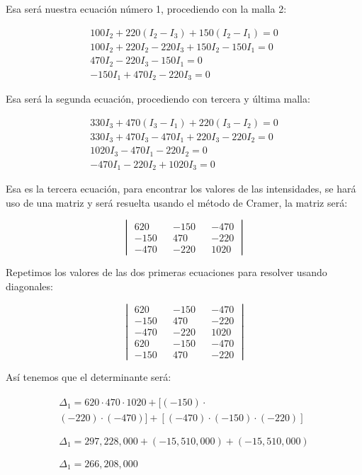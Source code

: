 \documentclass[conference]{IEEEtran}
\begin{document}
Esa será nuestra ecuación número 1, procediendo con la malla 2:

\begin{align*}
  100I_2 + 220(I_2 - I_3) + 150(I_2 - I_1) = 0 \\
  100I_2 + 220I_2 - 220I_3 + 150I_2 - 150I_1 = 0 \\
  470I_2 - 220I_3 - 150I_1 = 0 \\
  -150I_1 + 470I_2 - 220I_3 = 0
\end{align*}

Esa será la segunda ecuación, procediendo con tercera y última malla:

\begin{align*}
  330I_3 + 470(I_3 - I_1) + 220(I_3 - I_2) = 0 \\
  330I_3 + 470I_3 - 470I_1 + 220I_3 - 220I_2 = 0 \\
  1020I_3 - 470I_1 - 220I_2 = 0 \\
  -470I_1 - 220I_2 + 1020I_3 = 0
\end{align*}

Esa es la tercera ecuación, para encontrar los valores de las
intensidades, se hará uso de una matriz y será resuelta usando el
método de Cramer, la matriz será:

\begin{equation}
  \begin{vmatrix}
    620 && -150 && -470 \\
    -150 && 470 && -220 \\
    -470 && -220 && 1020
  \end{vmatrix}
\end{equation}

Repetimos los valores de las dos primeras ecuaciones para resolver
usando diagonales:

\begin{equation}
  \begin{vmatrix}
    620 && -150 && -470 \\
    -150 && 470 && -220 \\
    -470 && -220 && 1020 \\
    620 && -150 && -470 \\
    -150 && 470 && -220
  \end{vmatrix}
\end{equation}

Así tenemos que el determinante será:

\begin{align*}
  \begin{split}
    \Delta_1 = 620 \cdot 470 \cdot 1020 + [(-150) \cdot \\
    (-220) \cdot (-470)] + [(-470) \cdot (-150) \cdot (-220)]
  \end{split} \\ \\
  \begin{split}
    \Delta_1 = 297,228,000 + (-15,510,000) + (-15,510,000)
  \end{split} \\ \\
  \begin{split}
    \Delta_1 = 266,208,000
  \end{split}
\end{align*}
\end{document}
